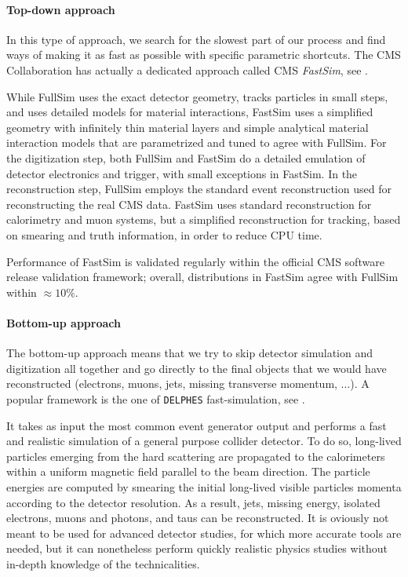 \paragraph{Top-down approach}

In this type of approach, we search for the slowest part of our process and find ways of making it as fast as possible with specific parametric shortcuts. The CMS Collaboration has actually a dedicated approach called CMS \emph{FastSim}, see \cite{https://doi.org/10.48550/arxiv.1701.03850}. 

While FullSim uses the exact detector geometry, tracks particles in small steps, and uses
detailed models for material interactions, FastSim uses a simplified geometry with infinitely thin material layers and simple analytical material interaction models that are parametrized
and tuned to agree with FullSim. For the digitization step, both FullSim and FastSim do a detailed
emulation of detector electronics and trigger, with small exceptions in FastSim. In the reconstruction step, FullSim employs the standard event reconstruction used for reconstructing the real CMS
data. FastSim uses standard reconstruction for calorimetry and muon systems, but a simplified
reconstruction for tracking, based on smearing and truth information, in order to reduce CPU time.

Performance of FastSim is validated regularly within the official CMS software release validation framework; overall, distributions in FastSim agree with FullSim within $\approx 10\%$.

\paragraph{Bottom-up approach}

The bottom-up approach means that we try to skip detector simulation and digitization all together and go directly to the final objects that we would have reconstructed (electrons, muons, jets, missing transverse momentum, $\dots$). A popular framework is the one of \texttt{DELPHES} fast-simulation, see \cite{de_Favereau_2014}.

It takes as input the most common event generator output and performs a fast and realistic simulation of
a general purpose collider detector. To do so, long-lived particles emerging from the hard
scattering are propagated to the calorimeters within a uniform magnetic field parallel to
the beam direction. The particle energies are computed by smearing the initial long-lived
visible particles momenta according to the detector resolution. As a result, jets, missing
energy, isolated electrons, muons and photons, and taus can be reconstructed. It is oviously not meant to
be used for advanced detector studies, for which more accurate tools are needed, but it can nonetheless perform quickly realistic physics studies without in-depth knowledge of the technicalities.


